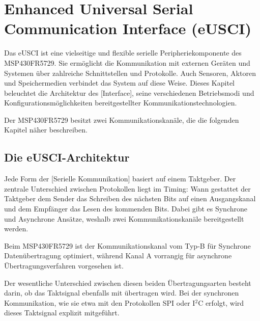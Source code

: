 \newpage
\section{Enhanced Universal Serial Communication Interface (eUSCI)}
\label{sec:eUSCI}

Das eUSCI ist eine vielseitige und flexible serielle Peripheriekomponente des \\MSP430FR5729. Sie erm\"oglicht die Kommunikation mit externen Ger\"aten und Systemen \"uber zahlreiche Schnittstellen und Protokolle. Auch Sensoren, Aktoren und Speichermedien verbindet das System auf diese Weise. Dieses Kapitel beleuchtet die Architektur des [Interface], seine verschiedenen Betriebsmodi und Konfigurationsm\"oglichkeiten bereitgestellter Kommunikationstechnologien.

Der MSP430FR5729 besitzt zwei Kommunikationskan\"ale, die die folgenden Kapitel n\"aher beschreiben.

\subsection{Die eUSCI-Architektur}
\label{sec:eUSCI_Architektur}

Jede Form der [Serielle Kommunikation] basiert auf einem Taktgeber. Der zentrale Unterschied zwischen Protokollen liegt im Timing: Wann gestattet der Taktgeber dem Sender das Schreiben des n\"achsten Bits auf einen Ausgangskanal und dem Empf\"anger das Lesen des kommenden Bits. Dabei gibt es Synchrone und Asynchrone Ans\"atze, weshalb zwei Kommunikationskan\"ale bereitgestellt werden.\\

Beim MSP430FR5729 ist der Kommunikationskanal vom Typ-B f\"ur Synchrone Daten\"ubertragung optimiert, w\"ahrend Kanal A vorrangig f\"ur asynchrone \"Ubertragungsverfahren vorgesehen ist. 

Der wesentliche Unterschied zwischen diesen beiden \"Ubertragungsarten besteht darin, ob das Taktsignal ebenfalls mit \"ubertragen wird. Bei der synchronen Kommunikation, wie sie etwa mit den Protokollen SPI oder I$^{2}$C erfolgt, wird dieses Taktsignal explizit mitgef\"uhrt. 

